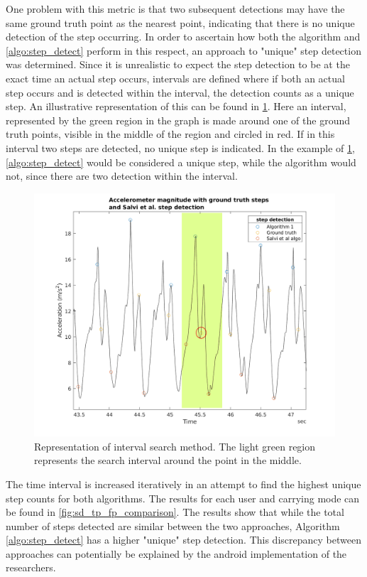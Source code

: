 One problem with this metric is that two subsequent detections may have the same ground truth point as the nearest point, indicating that there is no unique detection of the step occurring. In order to ascertain how both the \citet{Salvi2018} algorithm and \cref{algo:step_detect} perform in this respect, an approach to "unique" step detection was determined. Since it is unrealistic to expect the step detection to be at the exact time an actual step occurs, intervals are defined where if both an actual step occurs and is detected within the interval, the detection counts as a unique step. An illustrative representation of this can be found in \cref{fig:202011121558_true_positive_example_1}. Here an interval, represented by the green region in the graph is made around one of the ground truth points, visible in the middle of the region and circled in red. If in this interval two steps are detected, no unique step is indicated. In the example of  \cref{fig:202011121558_true_positive_example_1},  \cref{algo:step_detect} would be considered a unique step, while the \citet{Salvi2018} algorithm would not, since there are two detection within the interval.

\begin{figure}
	\centering
	\includegraphics[width=0.75\linewidth]{images/20201112_1809_true_positive_example_2}
	\caption{Representation of interval search method. The light green region represents the search interval around the \citet{Salvi2018} point in the middle.}
	\label{fig:202011121558_true_positive_example_1}
\end{figure}

The time interval is increased iteratively in an attempt to find the highest unique step counts for both algorithms. The results for each user and carrying mode can be found in \cref{fig:sd_tp_fp_comparison}. The results show that while the total number of steps detected are similar between the two approaches, Algorithm \ref{algo:step_detect} has a higher "unique" step detection. This discrepancy between approaches can potentially be explained by the android implementation of the researchers. 

